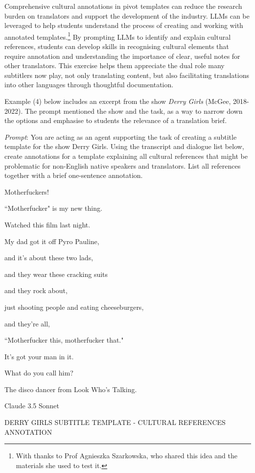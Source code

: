 \documentclass[output=paper]{langscibook}
\begin{document}
Comprehensive cultural annotations in pivot templates can reduce the research burden on translators \citep{Valdezetal2023} and support the development of the industry. LLMs can be leveraged to help students understand the process of creating and working with annotated templates.\footnote{ \textrm{With thanks to Prof Agnieszka Szarkowska, who shared this idea and the materials she used to test it.}} By prompting LLMs to identify and explain cultural references, students can develop skills in recognising cultural elements that require annotation and understanding the importance of clear, useful notes for other translators. This exercise helps them appreciate the dual role many subtitlers now play, not only translating content, but also facilitating translations into other languages through thoughtful documentation.

Example (4) below includes an excerpt from the show \textit{Derry Girls} (McGee, 2018-2022). The prompt mentioned the show and the task, as a way to narrow down the options and emphasise to students the relevance of a translation brief.

\ea\textit{Prompt}: You are acting as an agent supporting the task of creating a subtitle template for the show Derry Girls. Using the transcript and dialogue list below, create annotations for a template explaining all cultural references that might be problematic for non-English native speakers and translators. List all references together with a brief one-sentence annotation.\medskip


Motherfuckers!\medskip

``Motherfucker" is my new thing.

Watched this film last night.

My dad got it off Pyro Pauline,

and it's about these two lads,

and they wear these cracking suits

and they rock about,

just shooting people and eating cheeseburgers,

and they're all,

``Motherfucker this, motherfucker that."

It's got your man in it.

What do you call him?

The disco dancer from Look Who's Talking.

\ea Claude 3.5 Sonnet
\ttfamily

{DERRY GIRLS SUBTITLE TEMPLATE - CULTURAL REFERENCES ANNOTATION}
\end{document}
